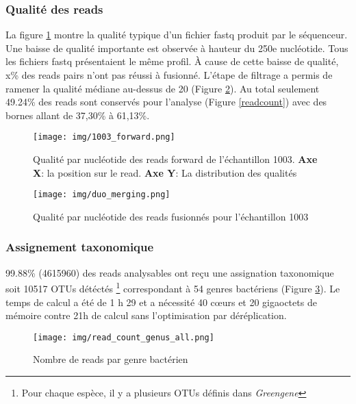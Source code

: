 \documentclass[12pt,a4paper]{article}
\begin{document}
\subsubsection{Qualité des reads}
La figure \ref{fastqt} montre la qualité typique d'un fichier fastq produit par le séquenceur. Une baisse de qualité importante est observée à hauteur du 250e nucléotide. Tous les fichiers fastq présentaient le même profil.
À cause de cette baisse de qualité, x\% des reads pairs n'ont pas réussi à fusionné.
L'étape de filtrage a permis de ramener la qualité médiane au-dessus de 20 (Figure \ref{fastqt_after}).
Au total seulement 49.24\% des reads sont conservés pour l'analyse (Figure \ref{readcount}) avec des bornes allant de 37,30\% à 61,13\%.



\begin{figure}[ht]
\begin{center}
\texttt{[image: img/1003\_forward.png]}\hfill
\end{center}
\caption{Qualité par nucléotide des reads forward de l'échantillon 1003. \textbf{Axe X}: la position sur le read. \textbf{Axe Y}: La distribution des qualités}
\label{fastqt}
\end{figure}


\begin{figure}[h]
\begin{center}
\texttt{[image: img/duo\_merging.png]}\hfill
\end{center}
\caption{Qualité par nucléotide des reads fusionnés pour l'échantillon 1003}
\label{fastqt_after}
\end{figure}


\subsubsection{Assignement taxonomique}
99.88\% (4615960) des reads analysables ont reçu une assignation taxonomique soit 10517 OTUs détéctés \footnote{Pour chaque espèce, il y a plusieurs OTUs définis dans \textit{Greengene}} correspondant à 54 genres bactériens (Figure \ref{readgenus}).
Le temps de calcul a été de 1 h 29 et a nécessité 40 cœurs et 20 gigaoctets de mémoire contre 21h de calcul sans l’optimisation par déréplication.


\begin{figure}[h]
\begin{center}
\texttt{[image: img/read\_count\_genus\_all.png]}\hfill
\end{center}
\caption{Nombre de reads par genre bactérien}
\label{readgenus}
\end{figure}
\end{document}
